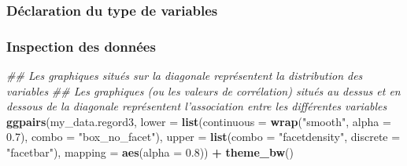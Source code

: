 \documentclass[
]{book}
\newenvironment{Shaded}{\begin{snugshade}}{\end{snugshade}}
\newcommand{\CommentTok}[1]{\textcolor[rgb]{0.56,0.35,0.01}{\textit{#1}}}
\newcommand{\DataTypeTok}[1]{\textcolor[rgb]{0.13,0.29,0.53}{#1}}
\newcommand{\FloatTok}[1]{\textcolor[rgb]{0.00,0.00,0.81}{#1}}
\newcommand{\KeywordTok}[1]{\textcolor[rgb]{0.13,0.29,0.53}{\textbf{#1}}}
\newcommand{\NormalTok}[1]{#1}
\newcommand{\OperatorTok}[1]{\textcolor[rgb]{0.81,0.36,0.00}{\textbf{#1}}}
\newcommand{\StringTok}[1]{\textcolor[rgb]{0.31,0.60,0.02}{#1}}
\begin{document}
\hypertarget{duxe9claration-du-type-de-variables-18}{%
\subsubsection{Déclaration du type de variables}\label{duxe9claration-du-type-de-variables-18}}

\begin{Shaded}
\end{Shaded}

\hypertarget{inspection-des-donnuxe9es-18}{%
\subsubsection{Inspection des données}\label{inspection-des-donnuxe9es-18}}

\begin{Shaded}
\begin{Highlighting}[]
\CommentTok{## Les graphiques situés sur la diagonale représentent la distribution des variables}
\CommentTok{## Les graphiques (ou les valeurs de corrélation) situés au dessus et en dessous de la diagonale représentent l'association entre les différentes variables}
\KeywordTok{ggpairs}\NormalTok{(my_data.regord3,}
        \DataTypeTok{lower =} \KeywordTok{list}\NormalTok{(}\DataTypeTok{continuous =} \KeywordTok{wrap}\NormalTok{(}\StringTok{"smooth"}\NormalTok{, }\DataTypeTok{alpha =} \FloatTok{0.7}\NormalTok{), }\DataTypeTok{combo =} \StringTok{"box_no_facet"}\NormalTok{),}
        \DataTypeTok{upper =} \KeywordTok{list}\NormalTok{(}\DataTypeTok{combo =} \StringTok{"facetdensity"}\NormalTok{, }\DataTypeTok{discrete =} \StringTok{"facetbar"}\NormalTok{), }
        \DataTypeTok{mapping =} \KeywordTok{aes}\NormalTok{(}\DataTypeTok{alpha =} \FloatTok{0.8}\NormalTok{)) }\OperatorTok{+}\StringTok{ }\KeywordTok{theme_bw}\NormalTok{()}
\end{Highlighting}
\end{Shaded}
\end{document}

